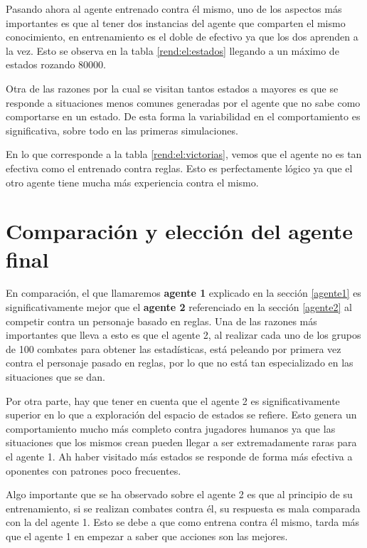 Pasando ahora al agente entrenado contra él mismo, uno de los aspectos más importantes es que al tener dos instancias del agente que comparten el mismo conocimiento, en entrenamiento es el doble de efectivo ya que los dos aprenden a la vez. Esto se observa en la tabla \ref{rend:el:estados} llegando a un máximo de estados rozando 80000.

\bigskip

Otra de las razones por la cual se visitan tantos estados a mayores es que se responde a situaciones menos comunes generadas por el agente que no sabe como comportarse en un estado. De esta forma la variabilidad en el comportamiento es significativa, sobre todo en las primeras simulaciones.

\bigskip

En lo que corresponde a la tabla \ref{rend:el:victorias}, vemos que el agente no es tan efectiva como el entrenado contra reglas. Esto es perfectamente lógico ya que el otro agente tiene mucha más experiencia contra el mismo.


\section{Comparación y elección del agente final}

En comparación, el que llamaremos \textbf{agente 1} explicado en la sección \ref{agente1} es significativamente mejor que el \textbf{agente 2} referenciado en la sección \ref{agente2} al competir contra un personaje basado en reglas. Una de las razones más importantes que lleva a esto es que el agente 2, al realizar cada uno de los grupos de 100 combates para obtener las estadísticas, está peleando por primera vez contra el personaje pasado en reglas, por lo que no está tan especializado en las situaciones que se dan.

\bigskip

Por otra parte, hay que tener en cuenta que el agente 2 es significativamente superior en lo que a exploración del espacio de estados se refiere. Esto genera un comportamiento mucho más completo contra jugadores humanos ya que las situaciones que los mismos crean pueden llegar a ser extremadamente raras para el agente 1. Ah haber visitado más estados se responde de forma más efectiva a oponentes con patrones poco frecuentes.

\bigskip

Algo importante que se ha observado sobre el agente 2 es que al principio de su entrenamiento, si se realizan combates contra él, su respuesta es mala comparada con la del agente 1. Esto se debe a que como entrena contra él mismo, tarda más que el agente 1 en empezar a saber que acciones son las mejores.

